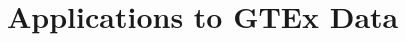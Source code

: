 \documentclass[12pt]{article}
\theoremstyle{theorem}
\begin{document}


\section{Applications to GTEx Data}

\end{document}
